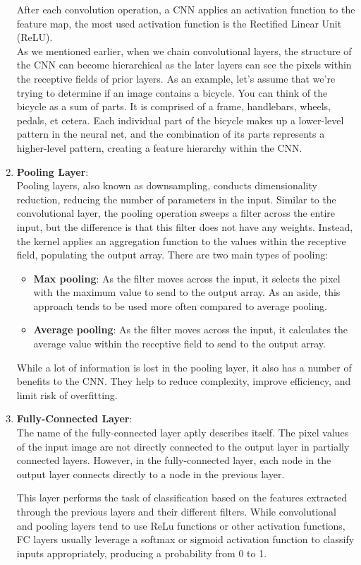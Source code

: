 \begin{enumerate}
        After each convolution operation, a CNN applies an activation function to the feature map, the most used activation function is the Rectified Linear Unit (ReLU).\\
        As we mentioned earlier, when we chain convolutional layers, the structure of the CNN can become hierarchical as the later layers can see the pixels within the receptive fields of prior layers.  As an example, let’s assume that we’re trying to determine if an image contains a bicycle. You can think of the bicycle as a sum of parts. It is comprised of a frame, handlebars, wheels, pedals, et cetera. Each individual part of the bicycle makes up a lower-level pattern in the neural net, and the combination of its parts represents a higher-level pattern, creating a feature hierarchy within the CNN.
    \item \textbf{Pooling Layer}:\\
        Pooling layers, also known as downsampling, conducts dimensionality reduction, reducing the number of parameters in the input. Similar to the convolutional layer, the pooling operation sweeps a filter across the entire input, but the difference is that this filter does not have any weights. Instead, the kernel applies an aggregation function to the values within the receptive field, populating the output array. There are two main types of pooling:
        \begin{itemize}
            \item \textbf{Max pooling}: As the filter moves across the input, it selects the pixel with the maximum value to send to the output array. As an aside, this approach tends to be used more often compared to average pooling.
            \item \textbf{Average pooling}: As the filter moves across the input, it calculates the average value within the receptive field to send to the output array.
        \end{itemize}
        
        While a lot of information is lost in the pooling layer, it also has a number of benefits to the CNN. They help to reduce complexity, improve efficiency, and limit risk of overfitting.
    
    \item \textbf{Fully-Connected Layer}:\\
        The name of the fully-connected layer aptly describes itself. The pixel values of the input image are not directly connected to the output layer in partially connected layers. However, in the fully-connected layer, each node in the output layer connects directly to a node in the previous layer.

        This layer performs the task of classification based on the features extracted through the previous layers and their different filters. While convolutional and pooling layers tend to use ReLu functions or other activation functions, FC layers usually leverage a softmax or sigmoid activation function to classify inputs appropriately, producing a probability from 0 to 1.
        
\end{enumerate}



